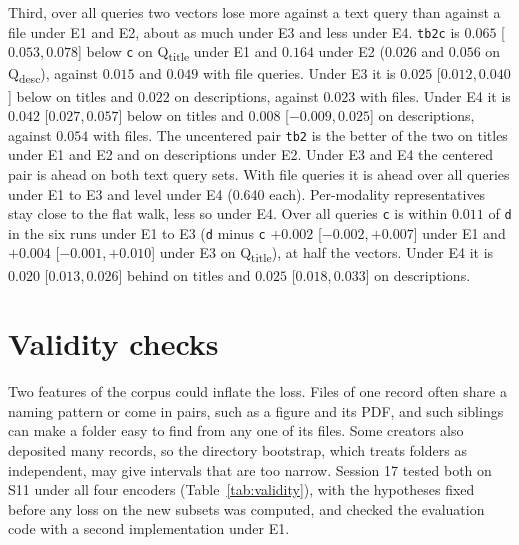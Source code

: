 \documentclass[11pt]{article}
\newcommand{\rep}[1]{\texttt{#1}}
\newcommand{\ci}[2]{[\ensuremath{#1},\,\ensuremath{#2}]}  %
\begin{document}
Third, over all queries two vectors lose more against a text query than against a file under E1 and E2, about as much under E3 and less under E4. \rep{tb2c} is $0.065$ \ci{0.053}{0.078} below \rep{c} on Q\textsubscript{title} under E1 and $0.164$ under E2 ($0.026$ and $0.056$ on Q\textsubscript{desc}), against $0.015$ and $0.049$ with file queries. Under E3 it is $0.025$ \ci{0.012}{0.040} below on titles and $0.022$ on descriptions, against $0.023$ with files. Under E4 it is $0.042$ \ci{0.027}{0.057} below on titles and $0.008$ \ci{-0.009}{0.025} on descriptions, against $0.054$ with files. The uncentered pair \rep{tb2} is the better of the two on titles under E1 and E2 and on descriptions under E2. Under E3 and E4 the centered pair is ahead on both text query sets. With file queries it is ahead over all queries under E1 to E3 and level under E4 (0.640 each). Per-modality representatives stay close to the flat walk, less so under E4. Over all queries \rep{c} is within $0.011$ of \rep{d} in the six runs under E1 to E3 (\rep{d} minus \rep{c} $+0.002$ \ci{-0.002}{+0.007} under E1 and $+0.004$ \ci{-0.001}{+0.010} under E3 on Q\textsubscript{title}), at half the vectors. Under E4 it is $0.020$ \ci{0.013}{0.026} behind on titles and $0.025$ \ci{0.018}{0.033} on descriptions.

\section{Validity checks}
\label{sec:validity}

Two features of the corpus could inflate the loss. Files of one record often share a naming pattern or come in pairs, such as a figure and its PDF, and such siblings can make a folder easy to find from any one of its files. Some creators also deposited many records, so the directory bootstrap, which treats folders as independent, may give intervals that are too narrow. Session 17 tested both on S11 under all four encoders (Table~\ref{tab:validity}), with the hypotheses fixed before any loss on the new subsets was computed, and checked the evaluation code with a second implementation under E1.
\end{document}
